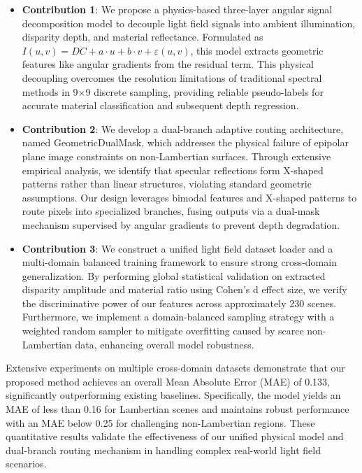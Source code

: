\documentclass[lettersize,journal]{IEEEtran}
\begin{document}
\begin{itemize}
\item \textbf{Contribution 1}: We propose a physics-based three-layer angular signal decomposition model to decouple light field signals into ambient illumination, disparity depth, and material reflectance. Formulated as $I(u,v) = DC + a \cdot u + b \cdot v + \varepsilon(u,v)$, this model extracts geometric features like angular gradients from the residual term. This physical decoupling overcomes the resolution limitations of traditional spectral methods in 9$\times$9 discrete sampling, providing reliable pseudo-labels for accurate material classification and subsequent depth regression.

\item \textbf{Contribution 2}: We develop a dual-branch adaptive routing architecture, named GeometricDualMask, which addresses the physical failure of epipolar plane image constraints on non-Lambertian surfaces. Through extensive empirical analysis, we identify that specular reflections form X-shaped patterns rather than linear structures, violating standard geometric assumptions. Our design leverages bimodal features and X-shaped patterns to route pixels into specialized branches, fusing outputs via a dual-mask mechanism supervised by angular gradients to prevent depth degradation.

\item \textbf{Contribution 3}: We construct a unified light field dataset loader and a multi-domain balanced training framework to ensure strong cross-domain generalization. By performing global statistical validation on extracted disparity amplitude and material ratio using Cohen's d effect size, we verify the discriminative power of our features across approximately 230 scenes. Furthermore, we implement a domain-balanced sampling strategy with a weighted random sampler to mitigate overfitting caused by scarce non-Lambertian data, enhancing overall model robustness.
\end{itemize}

Extensive experiments on multiple cross-domain datasets demonstrate that our proposed method achieves an overall Mean Absolute Error (MAE) of 0.133, significantly outperforming existing baselines. Specifically, the model yields an MAE of less than 0.16 for Lambertian scenes and maintains robust performance with an MAE below 0.25 for challenging non-Lambertian regions. These quantitative results validate the effectiveness of our unified physical model and dual-branch routing mechanism in handling complex real-world light field scenarios.
\end{document}
